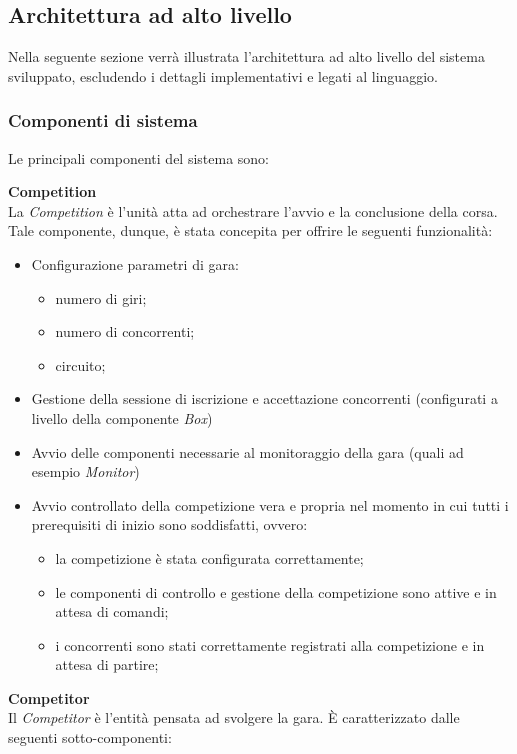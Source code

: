 \subsection{Architettura ad alto livello}
Nella seguente sezione verr\`{a} illustrata l'architettura ad alto livello del sistema sviluppato, 
escludendo i dettagli implementativi e legati al linguaggio.
\subsubsection{Componenti di sistema}
Le principali componenti del sistema sono:
\begin{description}
\item{\textbf{Competition}}\\
La \emph{Competition} \`{e} l'unit\`{a} atta ad orchestrare l'avvio e la conclusione della corsa. Tale componente, dunque, \`{e} stata concepita per 
offrire le seguenti funzionalit\`{a}:
\begin{itemize}
\item Configurazione parametri di gara:
	\begin{itemize}
		\item numero di giri;
		\item numero di concorrenti;
		\item circuito;
	\end{itemize}
\item Gestione della sessione di iscrizione e accettazione concorrenti (configurati a livello della componente \emph{Box})
\item Avvio delle componenti necessarie al monitoraggio della gara (quali ad esempio \emph{Monitor})
\item Avvio controllato della competizione vera e propria nel momento in cui tutti i prerequisiti di inizio sono soddisfatti, ovvero:
\begin{itemize}
\item la competizione \`{e} stata configurata correttamente;
\item le componenti di controllo e gestione della competizione sono attive e in attesa di comandi;
\item i concorrenti sono stati correttamente registrati alla competizione e in attesa di partire;
\end{itemize}
\end{itemize}
\item{\textbf{Competitor}}\\
Il \emph{Competitor} \`{e} l'entit\`{a} pensata ad svolgere la gara. \`{E} caratterizzato dalle seguenti sotto-componenti:

\end{description}

